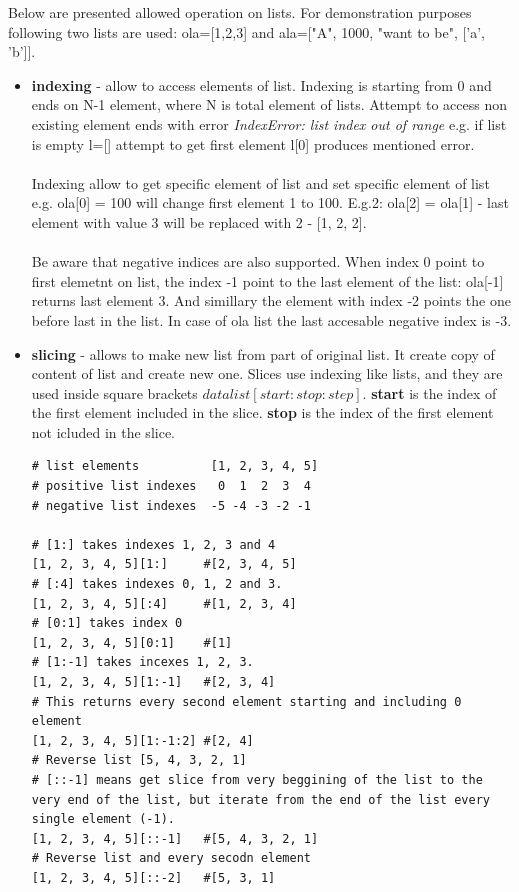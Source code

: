 \documentclass{article}
\begin{document}
	Below are presented allowed operation on lists. For demonstration purposes following two lists are used: ola=[1,2,3] and ala=["A", 1000, "want to be", ['a', 'b']].
	\begin{itemize}
	\item \textbf{indexing} - allow to access elements of list. Indexing is starting from 0 and ends on N-1 element, where N is total element of lists. Attempt to access non existing element ends with error \textit{\textcolor{pythonerror}{IndexError: list index out of range}} e.g. if list is empty l=[] attempt to get first element l[0] produces mentioned error.
	\paragraph{}	
	Indexing allow to get specific element of list and set specific element of list e.g. ola[0] = 100 will change first element 1 to 100. E.g.2: ola[2] = ola[1] - last element with value 3 will be replaced with 2 - [1, 2, 2].
	\paragraph{}
	Be aware that negative indices are also supported. When index 0 point to first elemetnt on list, the index -1 point to the last element of the list: ola[-1] returns last element 3. And simillary the element with index -2 points the one before last in the list. In case of ola list the last accesable negative index is -3. 
	\item \textbf{slicing} - allows to make new list from part of original list. It create copy of content of list and create new one. Slices use indexing like lists, and they are used inside square brackets $datalist[start:stop:step]$. \textbf{start} is the index of the first element included in the slice. \textbf{stop} is the index of the first element not icluded in the slice. 
	\begin{lstlisting}[style=pystyle]
# list elements          [1, 2, 3, 4, 5]
# positive list indexes   0  1  2  3  4
# negative list indexes  -5 -4 -3 -2 -1

# [1:] takes indexes 1, 2, 3 and 4
[1, 2, 3, 4, 5][1:]		#[2, 3, 4, 5]
# [:4] takes indexes 0, 1, 2 and 3.
[1, 2, 3, 4, 5][:4]		#[1, 2, 3, 4]
# [0:1] takes index 0
[1, 2, 3, 4, 5][0:1]	#[1]
# [1:-1] takes incexes 1, 2, 3.
[1, 2, 3, 4, 5][1:-1]	#[2, 3, 4]
# This returns every second element starting and including 0 element
[1, 2, 3, 4, 5][1:-1:2]	#[2, 4]
# Reverse list [5, 4, 3, 2, 1]
# [::-1] means get slice from very beggining of the list to the very end of the list, but iterate from the end of the list every single element (-1).
[1, 2, 3, 4, 5][::-1]	#[5, 4, 3, 2, 1]
# Reverse list and every secodn element
[1, 2, 3, 4, 5][::-2]	#[5, 3, 1]
	\end{lstlisting}

\end{itemize}
\end{document}
